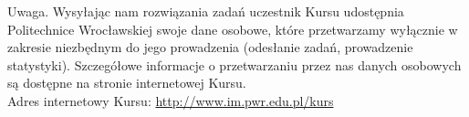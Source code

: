 \documentclass[10pt]{article}
\begin{document}
Uwaga. Wysyłając nam rozwiązania zadań uczestnik Kursu udostępnia Politechnice Wrocławskiej swoje dane osobowe, które przetwarzamy wyłącznie w zakresie niezbędnym do jego prowadzenia (odesłanie zadań, prowadzenie statystyki). Szczegółowe informacje o przetwarzaniu przez nas danych osobowych są dostępne na stronie internetowej Kursu.\\
Adres internetowy Kursu: \href{http://www.im.pwr.edu.pl/kurs}{http://www.im.pwr.edu.pl/kurs}
\end{document}
